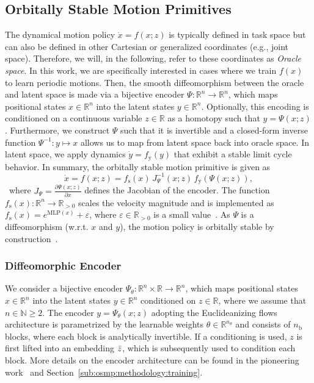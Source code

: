 \subsection{Orbitally Stable Motion Primitives}
The dynamical motion policy $\dot{x}=f(x; z)$ is typically defined in task space but can also be defined in other Cartesian or generalized coordinates (e.g., joint space). Therefore, we will, in the following, refer to these coordinates as \emph{Oracle space}.
In this work, we are specifically interested in cases where we train $f(x)$ to learn periodic motions.
Then, the smooth diffeomorphism between the oracle and latent space is made via a bijective encoder $\Psi: \mathbb{R}^n \to \mathbb{R}^n$, which maps positional states $x \in \mathbb{R}^n$ into the latent states $y \in \mathbb{R}^n$.
Optionally, this encoding is conditioned on a continuous variable $z \in \mathbb{R}$ as a homotopy such that $y = \Psi(x;z)$.
Furthermore, we construct $\Psi$ such that it is invertible and a closed-form inverse function $\Psi^{-1}: y \mapsto x$ allows us to map from latent space back into oracle space.
In latent space, we apply dynamics $\dot{y} = f_\mathrm{y}(y)$ that exhibit a stable limit cycle behavior. In summary, the orbitally stable motion primitive is given as
\begin{equation}\label{eq:osmp:dynamics}
    \dot{x} = f(x;z) = f_\mathrm{s}(x) \, J_\Psi^{-1}(x;z) \, f_\mathrm{y} \left (\Psi(x;z) \right ),
\end{equation}\
where $J_\Psi = \frac{\partial \Psi(x;z)}{\partial x}$ defines the Jacobian of the encoder. 
The function $f_\mathrm{s}(x): \mathbb{R}^n \to \mathbb{R}_{>0}$ scales the velocity magnitude and is implemented as $f_\mathrm{s}(x) = e^{\mathrm{MLP}(x)} + \varepsilon$, where $\varepsilon \in \mathbb{R}_{>0}$ is a small value~\citep{rana2020euclideanizing}.
As $\Psi$ is a diffeomorphism (w.r.t. $x$ and $y$), the motion policy is orbitally stable by construction~\citep{rana2020euclideanizing, zhi2024teaching}.

\subsubsection{Diffeomorphic Encoder}
We consider a bijective encoder $\Psi_\theta : \mathbb{R}^n \times \mathbb{R} \to \mathbb{R}^n$, which maps positional states $x \in \mathbb{R}^n$ into the latent states $y \in \mathbb{R}^n$ conditioned on $z \in \mathbb{R}$, where we assume that $n \in \mathbb{N} \geq 2$.
The encoder $y = \Psi_\theta(x;z)$ adopting the Euclideanizing flows~\citep{dinh2017density, rana2020euclideanizing} architecture is parametrized by the learnable weights $\theta \in \mathbb{R}^{n_\theta}$ and consists of $n_\mathrm{b}$ blocks, where each block is analytically invertible.
If a conditioning is used, $z$ is first lifted into an embedding $\Bar{z}$, which is subsequently used to condition each block.
More details on the encoder architecture can be found in the pioneering work~\citep{dinh2017density, rana2020euclideanizing} and Section~\ref{sub:osmp:methodology:training}.

